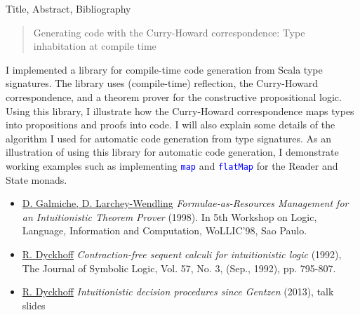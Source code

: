 \documentclass[english]{beamer}
\begin{document}
\begin{frame}{Title, Abstract, Bibliography}

\begin{quotation}
Generating code with the Curry-Howard correspondence: Type inhabitation
at compile time
\end{quotation}
{\footnotesize{}I implemented a library for compile-time code generation
from Scala type signatures. The library uses (compile-time) reflection,
the Curry-Howard correspondence, and a theorem prover for the constructive
propositional logic. Using this library, I illustrate how the Curry-Howard
correspondence maps types into propositions and proofs into code.
I will also explain some details of the algorithm I used for automatic
code generation from type signatures. As an illustration of using
this library for automatic code generation, I demonstrate working
examples such as implementing }\texttt{\textcolor{blue}{\footnotesize{}map}}{\footnotesize{}
and }\texttt{\textcolor{blue}{\footnotesize{}flatMap}}{\footnotesize{}
for the Reader and State monads.}{\footnotesize \par}
\begin{itemize}
\item {\footnotesize{}\href{http://citeseer.ist.psu.edu/viewdoc/summary?doi=10.1.1.35.2618}{D. Galmiche, D. Larchey-Wendling}
\textendash{} }\emph{\footnotesize{}Formulae-as-Resources Management
for an Intuitionistic Theorem Prover}{\footnotesize{} (1998). In 5th
Workshop on Logic, Language, Information and Computation, WoLLIC'98,
Sao Paulo.}{\footnotesize \par}
\item {\footnotesize{}\href{https://rd.host.cs.st-andrews.ac.uk/publications/jsl57.pdf}{R. Dyckhoff}
\textendash{} }\emph{\footnotesize{}Contraction-free sequent calculi
for intuitionistic logic}{\footnotesize{} (1992), The Journal of Symbolic
Logic, Vol. 57, No. 3, (Sep., 1992), pp. 795-807.}{\footnotesize \par}
\item {\footnotesize{}\href{http://apt13.unibe.ch/slides/Dyckhoff.pdf}{R. Dyckhoff}
\textendash{} }\emph{\footnotesize{}Intuitionistic decision procedures
since Gentzen}{\footnotesize{} (2013), talk slides}{\footnotesize \par}
\end{itemize}
\end{frame}
\end{document}
